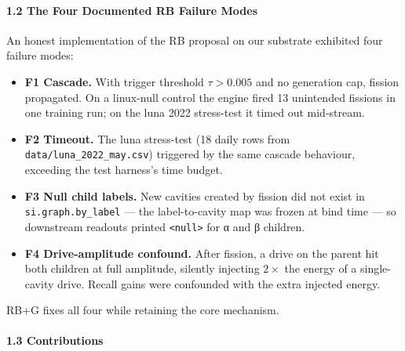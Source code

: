 \documentclass[
  11pt,
  a4paper,
]{article}
\providecommand{\tightlist}{%
  \setlength{\itemsep}{0pt}\setlength{\parskip}{0pt}}
\begin{document}
\paragraph{1.2 The Four Documented RB Failure
Modes}\label{the-four-documented-rb-failure-modes}

An honest implementation of the RB proposal on our substrate exhibited
four failure modes:

\begin{itemize}
\tightlist
\item
  \textbf{F1 Cascade.} With trigger threshold \(\tau > 0.005\) and no
  generation cap, fission propagated. On a linux-null control the engine
  fired 13 unintended fissions in one training run; on the luna 2022
  stress-test it timed out mid-stream.
\item
  \textbf{F2 Timeout.} The luna stress-test (18 daily rows from
  \texttt{data/luna\_2022\_may.csv}) triggered by the same cascade
  behaviour, exceeding the test harness's time budget.
\item
  \textbf{F3 Null child labels.} New cavities created by fission did not
  exist in \texttt{si.graph.by\_label} --- the label-to-cavity map was
  frozen at bind time --- so downstream readouts printed
  \texttt{\textless{}null\textgreater{}} for α and β children.
\item
  \textbf{F4 Drive-amplitude confound.} After fission, a drive on the
  parent hit both children at full amplitude, silently injecting
  \(2\times\) the energy of a single-cavity drive. Recall gains were
  confounded with the extra injected energy.
\end{itemize}

RB+G fixes all four while retaining the core mechanism.

\paragraph{1.3 Contributions}\label{contributions}
\end{document}
